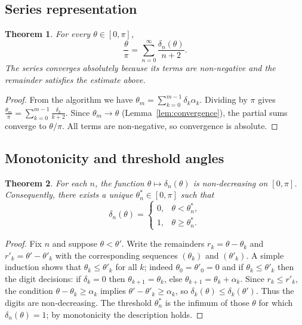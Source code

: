 \documentclass[11pt,a4paper]{article}
\newtheorem{theorem}{Theorem}[section]
\begin{document}
\subsection{Series representation}

\begin{theorem}\label{thm:series}
For every \(\theta\in[0,\pi]\),
\[
\frac{\theta}{\pi} = \sum_{n=0}^{\infty} \frac{\delta_n(\theta)}{n+2}.
\]
The series converges absolutely because its terms are non‑negative and the remainder satisfies the estimate above.
\end{theorem}

\begin{proof}
From the algorithm we have \(\theta_m = \sum_{k=0}^{m-1} \delta_k\alpha_k\).  Dividing by \(\pi\) gives \(\frac{\theta_m}{\pi} = \sum_{k=0}^{m-1} \frac{\delta_k}{k+2}\).  Since \(\theta_m\to\theta\) (Lemma~\ref{lem:convergence}), the partial sums converge to \(\theta/\pi\).  All terms are non‑negative, so convergence is absolute.
\end{proof}

\subsection{Monotonicity and threshold angles}

\begin{theorem}\label{thm:threshold}
For each \(n\), the function \(\theta\mapsto\delta_n(\theta)\) is non‑decreasing on \([0,\pi]\).  Consequently, there exists a unique \(\theta_n^*\in[0,\pi]\) such that
\[
\delta_n(\theta) =
\begin{cases}
0, & \theta < \theta_n^*,\\
1, & \theta \ge \theta_n^*.
\end{cases}
\]
\end{theorem}

\begin{proof}
Fix \(n\) and suppose \(\theta < \theta'\).  Write the remainders \(r_k = \theta - \theta_k\) and \(r'_k = \theta' - \theta'_k\) with the corresponding sequences \((\theta_k)\) and \((\theta'_k)\).  A simple induction shows that \(\theta_k \le \theta'_k\) for all \(k\); indeed \(\theta_0=\theta'_0=0\) and if \(\theta_k \le \theta'_k\) then the digit decisions: if \(\delta_k=0\) then \(\theta_{k+1}=\theta_k\), else \(\theta_{k+1}=\theta_k+\alpha_k\).  Since \(r_k \le r'_k\), the condition \(\theta-\theta_k\ge\alpha_k\) implies \(\theta'-\theta'_k\ge\alpha_k\), so \(\delta_k(\theta)\le\delta_k(\theta')\).  Thus the digits are non‑decreasing.  The threshold \(\theta_n^*\) is the infimum of those \(\theta\) for which \(\delta_n(\theta)=1\); by monotonicity the description holds.
\end{proof}
\end{document}
